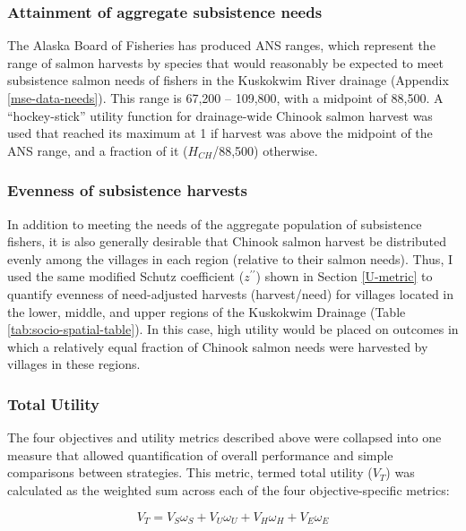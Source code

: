 \documentclass[12pt,]{book}
\theoremstyle{definition}
\theoremstyle{definition}
\theoremstyle{definition}
\theoremstyle{remark}
\begin{document}
\subsubsection{Attainment of aggregate subsistence
needs}\label{attainment-of-aggregate-subsistence-needs}

\noindent
The Alaska Board of Fisheries has produced ANS ranges, which represent
the range of salmon harvests by species that would reasonably be
expected to meet subsistence salmon needs of fishers in the Kuskokwim
River drainage (Appendix \ref{mse-data-needs}). This range is 67,200 --
109,800, with a midpoint of 88,500. A ``hockey-stick'' utility function
for drainage-wide Chinook salmon harvest was used that reached its
maximum at 1 if harvest was above the midpoint of the ANS range, and a
fraction of it (\(H_{CH}\)/88,500) otherwise.

\subsubsection{Evenness of subsistence
harvests}\label{evenness-of-subsistence-harvests}

\noindent
In addition to meeting the needs of the aggregate population of
subsistence fishers, it is also generally desirable that Chinook salmon
harvest be distributed evenly among the villages in each region
(relative to their salmon needs). Thus, I used the same modified Schutz
coefficient (\(z^{\prime\prime}\)) shown in Section \ref{U-metric} to
quantify evenness of need-adjusted harvests (harvest/need) for villages
located in the lower, middle, and upper regions of the Kuskokwim
Drainage (Table \ref{tab:socio-spatial-table}). In this case, high
utility would be placed on outcomes in which a relatively equal fraction
of Chinook salmon needs were harvested by villages in these regions.

\subsubsection{Total Utility}\label{total-utility}

\noindent
The four objectives and utility metrics described above were collapsed
into one measure that allowed quantification of overall performance and
simple comparisons between strategies. This metric, termed total utility
(\(V_T\)) was calculated as the weighted sum across each of the four
objective-specific metrics:

\begin{equation}
  V_T = V_S \omega_S + V_U \omega_U + V_H \omega_H + V_E \omega_E
  \label{eq:get-vt}
\end{equation}
\end{document}
